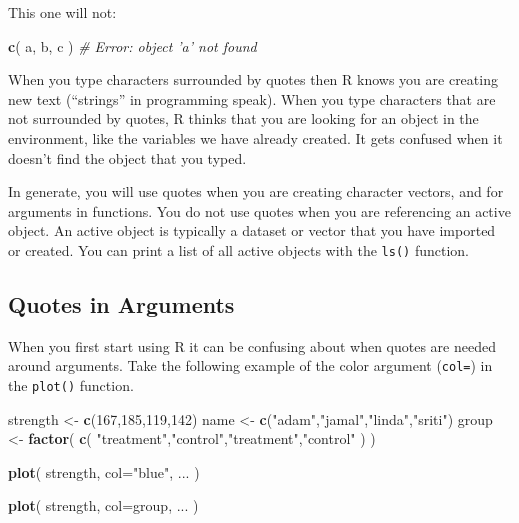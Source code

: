 \documentclass[]{book}
\newenvironment{Shaded}{\begin{snugshade}}{\end{snugshade}}
\newcommand{\CommentTok}[1]{\textcolor[rgb]{0.56,0.35,0.01}{\textit{#1}}}
\newcommand{\DataTypeTok}[1]{\textcolor[rgb]{0.13,0.29,0.53}{#1}}
\newcommand{\DecValTok}[1]{\textcolor[rgb]{0.00,0.00,0.81}{#1}}
\newcommand{\KeywordTok}[1]{\textcolor[rgb]{0.13,0.29,0.53}{\textbf{#1}}}
\newcommand{\NormalTok}[1]{#1}
\newcommand{\StringTok}[1]{\textcolor[rgb]{0.31,0.60,0.02}{#1}}
\theoremstyle{definition}
\theoremstyle{definition}
\theoremstyle{definition}
\theoremstyle{remark}
\begin{document}
This one will not:

\begin{Shaded}
\begin{Highlighting}[]
\KeywordTok{c}\NormalTok{( a, b, c )  }
\CommentTok{# Error: object 'a' not found}
\end{Highlighting}
\end{Shaded}

When you type characters surrounded by quotes then R knows you are
creating new text (``strings'' in programming speak). When you type
characters that are not surrounded by quotes, R thinks that you are
looking for an object in the environment, like the variables we have
already created. It gets confused when it doesn't find the object that
you typed.

In generate, you will use quotes when you are creating character
vectors, and for arguments in functions. You do not use quotes when you
are referencing an active object. An active object is typically a
dataset or vector that you have imported or created. You can print a
list of all active objects with the \texttt{ls()} function.

\hypertarget{quotes-in-arguments}{%
\subsection{Quotes in Arguments}\label{quotes-in-arguments}}

When you first start using R it can be confusing about when quotes are
needed around arguments. Take the following example of the color
argument (\texttt{col=}) in the \texttt{plot()} function.

\begin{Shaded}
\begin{Highlighting}[]
\NormalTok{strength <-}\StringTok{ }\KeywordTok{c}\NormalTok{(}\DecValTok{167}\NormalTok{,}\DecValTok{185}\NormalTok{,}\DecValTok{119}\NormalTok{,}\DecValTok{142}\NormalTok{)}
\NormalTok{name <-}\StringTok{ }\KeywordTok{c}\NormalTok{(}\StringTok{"adam"}\NormalTok{,}\StringTok{"jamal"}\NormalTok{,}\StringTok{"linda"}\NormalTok{,}\StringTok{"sriti"}\NormalTok{)}
\NormalTok{group <-}\StringTok{ }\KeywordTok{factor}\NormalTok{( }\KeywordTok{c}\NormalTok{( }\StringTok{"treatment"}\NormalTok{,}\StringTok{"control"}\NormalTok{,}\StringTok{"treatment"}\NormalTok{,}\StringTok{"control"}\NormalTok{ ) )}

\KeywordTok{plot}\NormalTok{( strength, }\DataTypeTok{col=}\StringTok{"blue"}\NormalTok{, ... )}

\KeywordTok{plot}\NormalTok{( strength, }\DataTypeTok{col=}\NormalTok{group,  ... )}
\end{Highlighting}
\end{Shaded}
\end{document}
